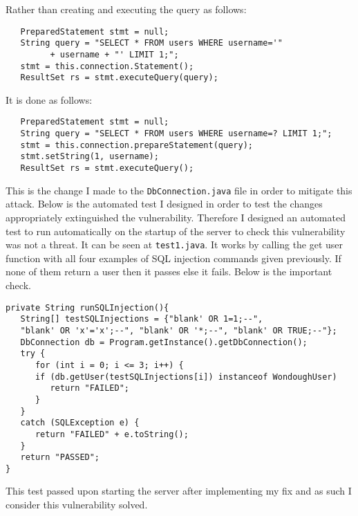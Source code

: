 Rather than creating and executing the query as follows:
\begin{verbatim}
   PreparedStatement stmt = null;
   String query = "SELECT * FROM users WHERE username='"
         + username + "' LIMIT 1;";
   stmt = this.connection.Statement();
   ResultSet rs = stmt.executeQuery(query);
\end{verbatim}
It is done as follows:
\begin{verbatim}
   PreparedStatement stmt = null;
   String query = "SELECT * FROM users WHERE username=? LIMIT 1;";
   stmt = this.connection.prepareStatement(query);
   stmt.setString(1, username);
   ResultSet rs = stmt.executeQuery();
\end{verbatim}
This is the change I made to the \verb|DbConnection.java| file in order to mitigate this attack. Below is the automated test I designed in order to test the changes appropriately extinguished the
vulnerability. Therefore I designed an automated test to run automatically on the startup of the server to check this vulnerability was not a threat. It can be seen at \verb|test1.java|. It
works by calling the get user function with all four examples of SQL injection commands given previously. If none of them return a user then it passes else it fails. Below is the
important check.\begin{verbatim}
private String runSQLInjection(){
   String[] testSQLInjections = {"blank' OR 1=1;--",
   "blank' OR 'x'='x';--", "blank' OR '*;--", "blank' OR TRUE;--"};
   DbConnection db = Program.getInstance().getDbConnection();
   try {
      for (int i = 0; i <= 3; i++) {
      if (db.getUser(testSQLInjections[i]) instanceof WondoughUser)
         return "FAILED";
      }
   }
   catch (SQLException e) {
      return "FAILED" + e.toString();
   }
   return "PASSED";
}
\end{verbatim}
This test passed upon starting the server after implementing my fix and as such I consider this vulnerability solved.
